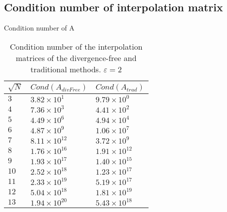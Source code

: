 \documentclass{beamer}
\begin{document}
\subsection{Condition number of interpolation matrix}
\begin{frame}{Condition number of A}%
  \begin{table}[hptb]
    \begin{center}
      \begin{tabular}{l||l|l}
        \multicolumn{1}{c||}{$\sqrt{N}$} & 
	\multicolumn{1}{c|}{$Cond(A_{divFree})$} & 
	\multicolumn{1}{c}{$Cond(A_{trad})$} \\
        \hline \hline
        $3$ & $3.82\times 10^{1}$ & $9.79\times 10^{0}$ \\
        $4$ & $7.36\times 10^{3}$ & $4.41\times 10^{2}$ \\
        $5$ & $4.49\times 10^{6}$ & $4.94\times 10^{4}$ \\
        $6$ & $4.87\times 10^{9}$ & $1.06\times 10^{7}$ \\
        $7$ & $8.11\times 10^{12}$ & $3.72\times 10^{9}$ \\
        $8$ & $1.76\times 10^{16}$ & $1.91\times 10^{12}$ \\
        $9$ & $1.93\times 10^{17}$ & $1.40\times 10^{15}$ \\
        $10$ & $2.52\times 10^{18}$ & $1.23\times 10^{17}$ \\
        $11$ & $2.33\times 10^{19}$ & $5.19\times 10^{17}$ \\
        $12$ & $5.04\times 10^{18}$ & $1.81\times 10^{19}$ \\
        $13$ & $1.94\times 10^{20}$ & $5.43\times 10^{18}$ \\
    \end{tabular}   
    \end{center}
    \caption{Condition number of the interpolation matrices of the 
    divergence-free and traditional methods. $\varepsilon = 2$}
  \end{table}
\end{frame}
\end{document}
